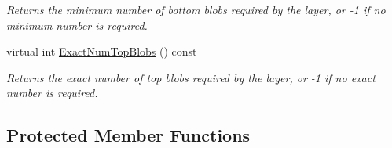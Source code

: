 \begin{DoxyCompactItemize}
\begin{DoxyCompactList}\small\item\em Returns the minimum number of bottom blobs required by the layer, or -\/1 if no minimum number is required. \end{DoxyCompactList}\item 
virtual int \mbox{\hyperlink{classcaffe_1_1_eltwise_layer_a60ae4a38cade1cc7f6111e51cabb441b}{Exact\+Num\+Top\+Blobs}} () const
\begin{DoxyCompactList}\small\item\em Returns the exact number of top blobs required by the layer, or -\/1 if no exact number is required. \end{DoxyCompactList}\end{DoxyCompactItemize}
\subsection*{Protected Member Functions}
